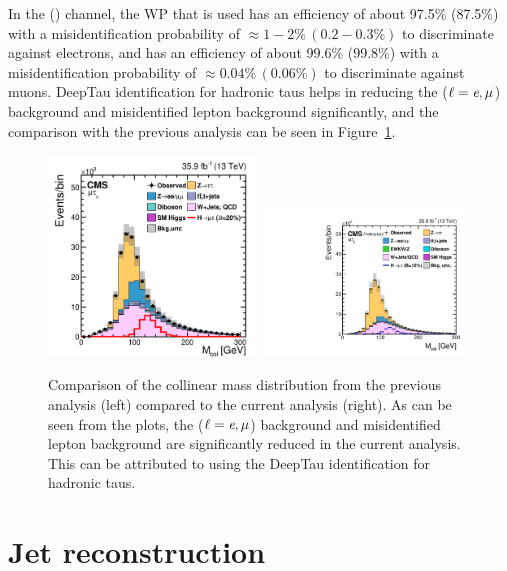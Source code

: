 In the \muhad (\ehad) channel, the WP that is used has an efficiency of about 97.5\% (87.5\%) with a misidentification probability of $\approx 1-2\% \, (0.2-0.3\%)$ to discriminate \tauh against electrons, and has an efficiency of about 99.6\% (99.8\%) with a misidentification probability of $\approx 0.04\% \, (0.06\%)$ to discriminate \tauh against muons. DeepTau identification for hadronic taus helps in reducing the \Zll($\ell=\textit{e},\mu$) background and misidentified lepton background significantly, and the comparison with the previous analysis can be seen in Figure~\ref{fig:collmass}.

\begin{figure}[hbtp]
  \centering
  \includegraphics[width=0.49\textwidth]{plots/chapter5/CollMass2016.png}
  \includegraphics[width=0.49\textwidth]{plots/chapter5/CollMassRun2.pdf}
  \caption{Comparison of the collinear mass distribution from the previous analysis (left) compared to the current analysis (right). As can be seen from the plots, the \Zll($\ell=\textit{e},\mu$) background and misidentified lepton background are significantly reduced in the current analysis. This can be attributed to using the DeepTau identification for hadronic taus.}
  \label{fig:collmass}
\end{figure}


\section{Jet reconstruction}

